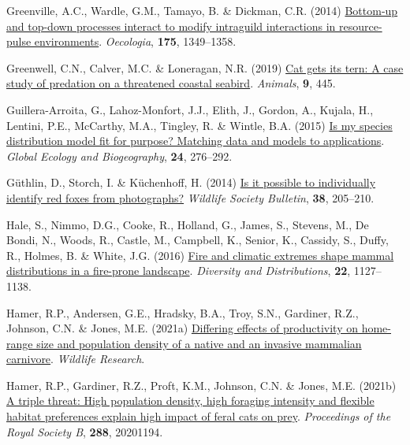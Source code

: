 \documentclass[11pt,a4paper,titlepage,twoside,openright]{style/unimelbthesis}
\newenvironment{CSLReferences}%
  {}%
  {\par}
\begin{document}
\begin{mainmatter}
\begin{CSLReferences}{1}{0}
\leavevmode{}%
Greenville, A.C., Wardle, G.M., Tamayo, B. \& Dickman, C.R. (2014) \href{https://doi.org/10.1007/s00442-014-2977-8}{Bottom-up and top-down processes interact to modify intraguild interactions in resource-pulse environments}. \emph{Oecologia}, \textbf{175}, 1349--1358.

\leavevmode{}%
Greenwell, C.N., Calver, M.C. \& Loneragan, N.R. (2019) \href{https://doi.org/10.3390/ani9070445}{Cat gets its tern: A case study of predation on a threatened coastal seabird}. \emph{Animals}, \textbf{9}, 445.

\leavevmode{}%
Guillera-Arroita, G., Lahoz-Monfort, J.J., Elith, J., Gordon, A., Kujala, H., Lentini, P.E., McCarthy, M.A., Tingley, R. \& Wintle, B.A. (2015) \href{https://doi.org/10.1111/geb.12268}{Is my species distribution model fit for purpose? Matching data and models to applications}. \emph{Global Ecology and Biogeography}, \textbf{24}, 276--292.

\leavevmode{}%
Güthlin, D., Storch, I. \& Küchenhoff, H. (2014) \href{https://doi.org/10.1002/wsb.377}{Is it possible to individually identify red foxes from photographs?} \emph{Wildlife Society Bulletin}, \textbf{38}, 205--210.

\leavevmode{}%
Hale, S., Nimmo, D.G., Cooke, R., Holland, G., James, S., Stevens, M., De Bondi, N., Woods, R., Castle, M., Campbell, K., Senior, K., Cassidy, S., Duffy, R., Holmes, B. \& White, J.G. (2016) \href{https://doi.org/10.1111/ddi.12471}{Fire and climatic extremes shape mammal distributions in a fire-prone landscape}. \emph{Diversity and Distributions}, \textbf{22}, 1127--1138.

\leavevmode{}%
Hamer, R.P., Andersen, G.E., Hradsky, B.A., Troy, S.N., Gardiner, R.Z., Johnson, C.N. \& Jones, M.E. (2021a) \href{https://doi.org/10.1071/WR20134}{Differing effects of productivity on home-range size and population density of a native and an invasive mammalian carnivore}. \emph{Wildlife Research}.

\leavevmode{}%
Hamer, R.P., Gardiner, R.Z., Proft, K.M., Johnson, C.N. \& Jones, M.E. (2021b) \href{https://doi.org/10.1098/rspb.2020.1194}{A triple threat: High population density, high foraging intensity and flexible habitat preferences explain high impact of feral cats on prey}. \emph{Proceedings of the Royal Society B}, \textbf{288}, 20201194.


\end{CSLReferences}
\end{mainmatter}
\end{document}
